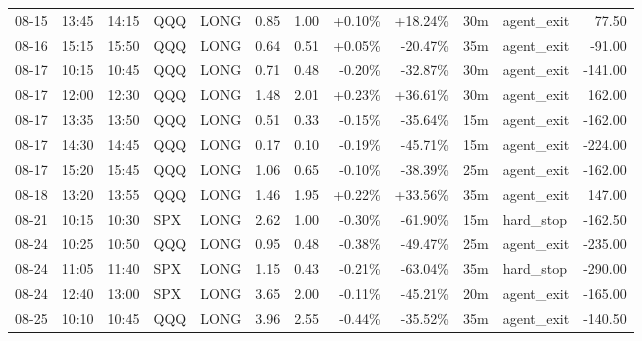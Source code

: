 \documentclass[11pt,a4paper,twoside]{article}
\begin{document}
\begin{center}
\begin{longtable}{>{\color{txtmain}}l l l l l r r r r r >{\color{txtmain}}l r}
08-15 & 13:45 & 14:15 & QQQ & LONG & 0.85 & 1.00 & \textcolor{wingreen}{+0.10\%} & \textcolor{wingreen}{+18.24\%} & 30m & agent\_exit & \textcolor{wingreen}{77.50} \\
08-16 & 15:15 & 15:50 & QQQ & LONG & 0.64 & 0.51 & \textcolor{wingreen}{+0.05\%} & \textcolor{lossred}{-20.47\%} & 35m & agent\_exit & \textcolor{lossred}{-91.00} \\
08-17 & 10:15 & 10:45 & QQQ & LONG & 0.71 & 0.48 & \textcolor{lossred}{-0.20\%} & \textcolor{lossred}{-32.87\%} & 30m & agent\_exit & \textcolor{lossred}{-141.00} \\
08-17 & 12:00 & 12:30 & QQQ & LONG & 1.48 & 2.01 & \textcolor{wingreen}{+0.23\%} & \textcolor{wingreen}{+36.61\%} & 30m & agent\_exit & \textcolor{wingreen}{162.00} \\
08-17 & 13:35 & 13:50 & QQQ & LONG & 0.51 & 0.33 & \textcolor{lossred}{-0.15\%} & \textcolor{lossred}{-35.64\%} & 15m & agent\_exit & \textcolor{lossred}{-162.00} \\
08-17 & 14:30 & 14:45 & QQQ & LONG & 0.17 & 0.10 & \textcolor{lossred}{-0.19\%} & \textcolor{lossred}{-45.71\%} & 15m & agent\_exit & \textcolor{lossred}{-224.00} \\
08-17 & 15:20 & 15:45 & QQQ & LONG & 1.06 & 0.65 & \textcolor{lossred}{-0.10\%} & \textcolor{lossred}{-38.39\%} & 25m & agent\_exit & \textcolor{lossred}{-162.00} \\
08-18 & 13:20 & 13:55 & QQQ & LONG & 1.46 & 1.95 & \textcolor{wingreen}{+0.22\%} & \textcolor{wingreen}{+33.56\%} & 35m & agent\_exit & \textcolor{wingreen}{147.00} \\
08-21 & 10:15 & 10:30 & SPX & LONG & 2.62 & 1.00 & \textcolor{lossred}{-0.30\%} & \textcolor{lossred}{-61.90\%} & 15m & hard\_stop & \textcolor{lossred}{-162.50} \\
08-24 & 10:25 & 10:50 & QQQ & LONG & 0.95 & 0.48 & \textcolor{lossred}{-0.38\%} & \textcolor{lossred}{-49.47\%} & 25m & agent\_exit & \textcolor{lossred}{-235.00} \\
08-24 & 11:05 & 11:40 & SPX & LONG & 1.15 & 0.43 & \textcolor{lossred}{-0.21\%} & \textcolor{lossred}{-63.04\%} & 35m & hard\_stop & \textcolor{lossred}{-290.00} \\
08-24 & 12:40 & 13:00 & SPX & LONG & 3.65 & 2.00 & \textcolor{lossred}{-0.11\%} & \textcolor{lossred}{-45.21\%} & 20m & agent\_exit & \textcolor{lossred}{-165.00} \\
08-25 & 10:10 & 10:45 & QQQ & LONG & 3.96 & 2.55 & \textcolor{lossred}{-0.44\%} & \textcolor{lossred}{-35.52\%} & 35m & agent\_exit & \textcolor{lossred}{-140.50} \\

\end{longtable}
\end{center}
\end{document}
